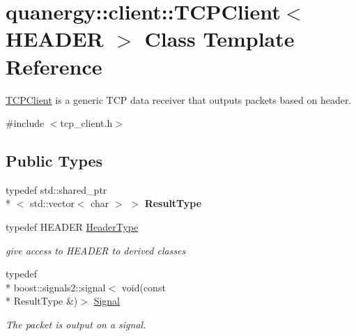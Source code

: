 \hypertarget{classquanergy_1_1client_1_1TCPClient}{\section{quanergy\-:\-:client\-:\-:T\-C\-P\-Client$<$ H\-E\-A\-D\-E\-R $>$ Class Template Reference}
\label{classquanergy_1_1client_1_1TCPClient}
}


\hyperlink{classquanergy_1_1client_1_1TCPClient}{T\-C\-P\-Client} is a generic T\-C\-P data receiver that outputs packets based on header.  




{\ttfamily \#include $<$tcp\-\_\-client.\-h$>$}

\subsection*{Public Types}
\begin{DoxyCompactItemize}
\item 
\hypertarget{classquanergy_1_1client_1_1TCPClient_accb45d0241bc624ad63cf538b1585303}{typedef std\-::shared\-\_\-ptr\\*
$<$ std\-::vector$<$ char $>$ $>$ {\bfseries Result\-Type}}\label{classquanergy_1_1client_1_1TCPClient_accb45d0241bc624ad63cf538b1585303}

\item 
\hypertarget{classquanergy_1_1client_1_1TCPClient_a7b6902ce00b83a91c45162a7f718a64d}{typedef H\-E\-A\-D\-E\-R \hyperlink{classquanergy_1_1client_1_1TCPClient_a7b6902ce00b83a91c45162a7f718a64d}{Header\-Type}}\label{classquanergy_1_1client_1_1TCPClient_a7b6902ce00b83a91c45162a7f718a64d}

\begin{DoxyCompactList}\small\item\em give access to H\-E\-A\-D\-E\-R to derived classes \end{DoxyCompactList}\item 
\hypertarget{classquanergy_1_1client_1_1TCPClient_aa1754d14fea33b06a40a63b42b0e560c}{typedef \\*
boost\-::signals2\-::signal$<$ void(const \\*
Result\-Type \&)$>$ \hyperlink{classquanergy_1_1client_1_1TCPClient_aa1754d14fea33b06a40a63b42b0e560c}{Signal}}\label{classquanergy_1_1client_1_1TCPClient_aa1754d14fea33b06a40a63b42b0e560c}

\begin{DoxyCompactList}\small\item\em The packet is output on a signal. \end{DoxyCompactList}\end{DoxyCompactItemize}
